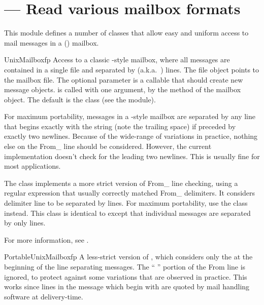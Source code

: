 \section{ ---
         Read various mailbox formats}



This module defines a number of classes that allow easy and uniform
access to mail messages in a (\UNIX) mailbox.

\begin{classdesc}{UnixMailbox}{fp}
Access to a classic \UNIX-style mailbox, where all messages are
contained in a single file and separated by 
(a.k.a.\ ) lines.  The file object  points to the
mailbox file.  The optional  parameter is a callable that
should create new message objects.   is called with one
argument,  by the  method of the mailbox
object.  The default is the  class (see the
 module).

For maximum portability, messages in a \UNIX-style mailbox are
separated by any line that begins exactly with the string  (note the trailing space) if preceded by exactly two newlines.
Because of the wide-range of variations in practice, nothing else on
the From_ line should be considered.  However, the current
implementation doesn't check for the leading two newlines.  This is
usually fine for most applications.

The  class implements a more strict version of
From_ line checking, using a regular expression that usually correctly
matched From_ delimiters.  It considers delimiter line to be separated
by  lines.  For maximum portability,
use the  class instead.  This class is
identical to  except that individual messages are
separated by only  lines.

For more information, see
.
\end{classdesc}

\begin{classdesc}{PortableUnixMailbox}{fp}
A less-strict version of , which considers only the
 at the beginning of the line separating messages.  The
`` '' portion of the From line is ignored, to
protect against some variations that are observed in practice.  This
works since lines in the message which begin with  are
quoted by mail handling software at delivery-time.
\end{classdesc}

